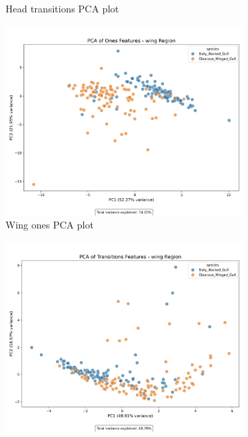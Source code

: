 \documentclass[a4paper,12pt]{report}
\begin{document}
\begin{figure}[H]
\begin{subfigure}[b]{0.48\textwidth}
        \caption{Head transitions PCA plot}
    \end{subfigure}
    \vspace{0.5cm}
    \begin{subfigure}[b]{0.48\textwidth}
        \includegraphics[width=\textwidth]{images/appendix/Original/pca/wing_ones_pca_plot.png}
        \caption{Wing ones PCA plot}
    \end{subfigure}
    \hfill
    \begin{subfigure}[b]{0.48\textwidth}
        \includegraphics[width=\textwidth]{images/appendix/Original/pca/wing_transitions_pca_plot.png}

\end{subfigure}
\end{figure}
\end{document}
